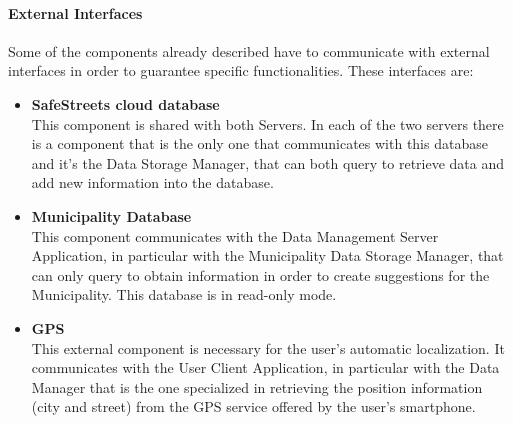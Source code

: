 \documentclass[titlepage]{article}
\begin{document}
\paragraph{\textbf{External Interfaces}}
Some of the components already described have to communicate with external interfaces in order to guarantee specific functionalities. These interfaces are:
\begin{itemize}
\item \textbf{SafeStreets cloud database}\\
This component is shared with both Servers. In each of the two servers there is a component that is the only one that communicates with this database and it's the Data Storage Manager, that can both query to retrieve data and add new information into the database.
\item \textbf{Municipality Database}\\
This component communicates with the Data Management Server Application, in particular with the Municipality Data Storage Manager, that can only query to obtain information in order to create suggestions for the Municipality. This database is in read-only mode.
\item \textbf{GPS}\\
This external component is necessary for the user's automatic localization. It communicates with the User Client Application, in particular with the Data Manager that is the one specialized in retrieving the position information (city and street) from the GPS service offered by the user's smartphone.
\end{itemize}
\end{document}
